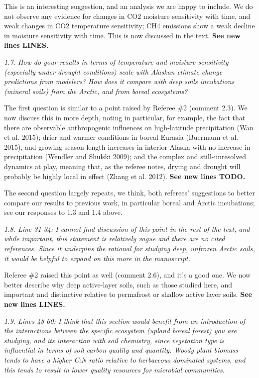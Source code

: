\documentclass[11pt, oneside]{article}
\begin{document}
This is an interesting suggestion, and an analysis we are happy to include. We do not observe any evidence for changes in CO2 moisture sensitivity with time, and weak changes in CO2 temperature sensitivity; CH4 emissions show a weak decline in moisture sensitivity with time. This is now discussed in the text. {\bf See new lines LINES.}

\medskip
{\it 1.7. How do your results in terms of temperature and moisture sensitivity (especially under drought conditions) scale with Alaskan climate change predictions from modelers? How does it compare with deep soils incubations (mineral soils) from the Arctic, and from boreal ecosystems? }

The first question is similar to a point raised by Referee \#2 (comment 2.3). We now discuss this in more depth, noting in particular, for example, the fact that there are observable anthropogenic influences on high-latitude precipitation (Wan et al. 2015); drier and warmer conditions in boreal Eurasia (Buermann et al. 2015), and growing season length increases in interior Alaska with no increase in precipitation (Wendler and Shulski 2009); and the complex and still-unresolved dynamics at play, meaning that, as the referee notes, drying and drought will probably be highly local in effect (Zhang et al. 2012). {\bf See new lines TODO.}

The second question largely repeats, we think, both referees' suggestions to better compare our results to previous work, in particular boreal and Arctic incubations; see our responses to 1.3 and 1.4 above.

\medskip
{\it 1.8. Line 31-34: I cannot find discussion of this point in the rest of the text, and while important, this statement is relatively vague and there are no cited references. Since it underpins the rational for studying deep, unfrozen Arctic soils, it would be helpful to expand on this more in the manuscript. }

Referee \#2 raised this point as well (comment 2.6), and it's a good one. We now better describe why deep active-layer soils, such as those studied here, and important and distinctive relative to permafrost or shallow active layer soils.  {\bf See new lines LINES.}

\medskip
{\it 1.9. Lines 48-60: I think that this section would benefit from an introduction of the interactions between the specific ecosystem (upland boreal forest) you are studying, and its interaction with soil chemistry, since vegetation type is influential in terms of soil carbon quality and quantity. Woody plant biomass tends to have a higher C:N ratio relative to herbaceous dominated systems, and this tends to result in lower quality resources for microbial communities. }
\end{document}
